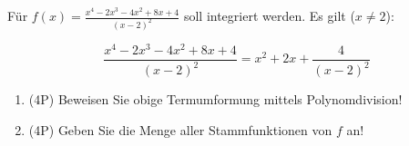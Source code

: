 Für $f(x)=\frac{x^4-2x^3-4x^2+8x+4}{(x-2)^2}$ soll integriert werden. Es gilt ($x\ne 2$):

$$
	\frac{x^4-2x^3-4x^2+8x+4}{(x-2)^2} = x^2+2x+\frac{4}{(x-2)^2}
$$

\begin{enumerate}[label=(\alph*)]
		\item (4P) Beweisen Sie obige Termumformung mittels Polynomdivision!
			\bigskip
			\bigskip
			\bigskip
			\bigskip
			\bigskip
			\bigskip
			\bigskip
			\bigskip
			\bigskip
			\bigskip
			\bigskip

		\item (4P) Geben Sie die Menge aller Stammfunktionen von $f$ an!
\end{enumerate}